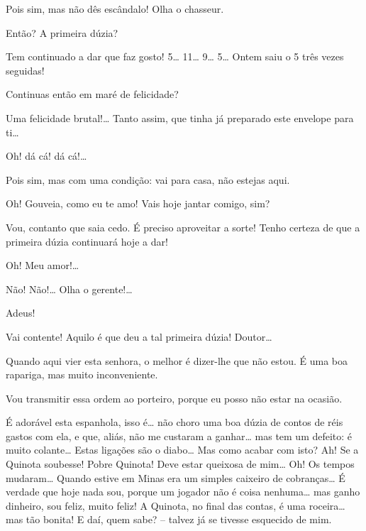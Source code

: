  Pois sim, mas não dês escândalo! Olha o chasseur. 

 Então? A primeira dúzia?

 Tem continuado a dar que faz gosto! 5\ldots{} 11\ldots{} 9\ldots{} 5\ldots{} Ontem
saiu o 5 três vezes seguidas!

 Continuas então em maré de felicidade?

 Uma felicidade brutal!\ldots{} Tanto assim, que tinha já preparado
este envelope para ti\ldots{}

 Oh! dá cá! dá cá!\ldots{}

 Pois sim, mas com uma condição: vai para casa, não estejas aqui.

  Oh! Gouveia, como eu te amo! Vais hoje jantar
comigo, sim?

 Vou, contanto que saia cedo. É preciso aproveitar a sorte! Tenho
certeza de que a primeira dúzia continuará hoje a dar!

  Oh! Meu amor!\ldots{} 

 Não! Não!\ldots{} Olha o gerente!\ldots{}

 Adeus! 

  Vai contente! Aquilo é que deu a
tal primeira dúzia!  Doutor\ldots{}

 Quando aqui vier esta senhora, o melhor é dizer-lhe que não
estou. É uma boa rapariga, mas muito inconveniente.

 Vou transmitir essa ordem ao porteiro, porque eu posso não
estar na ocasião. 


  É adorável esta espanhola, isso é\ldots{} não choro uma boa
dúzia de contos de réis gastos com ela, e que, aliás, não me custaram a ganhar\ldots{}
mas tem um defeito: é muito colante\ldots{} Estas ligações são o diabo\ldots{} Mas como
acabar com isto? Ah! Se a Quinota soubesse! Pobre Quinota! Deve estar queixosa de
mim\ldots{} Oh! Os tempos mudaram\ldots{} Quando estive em Minas era um simples caixeiro de
cobranças\ldots{} É verdade que hoje nada sou, porque um jogador não é coisa
nenhuma\ldots{} mas ganho dinheiro, sou feliz, muito feliz! A Quinota, no final
das contas, é uma roceira\ldots{} mas tão bonita! E daí, quem sabe? -- talvez já se tivesse
esquecido de mim.

